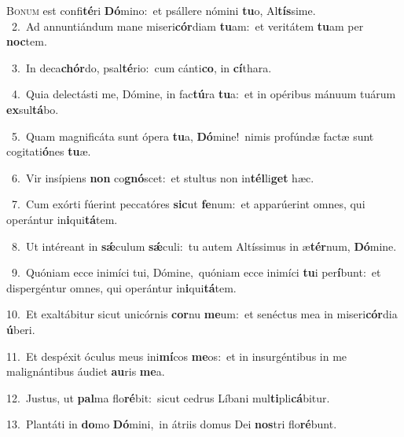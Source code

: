 \lettrine{\initial\textcolor{\initialcolor}{B}}{onum} est confi\-\textbf{té}\-ri \textbf{Dó}\-mino:~\star et psállere nómini \textbf{tu}\-o, Al\-\textbf{tís}\-sime.\\
{\numbfont\textcolor{\numbcolor}{~2.}}~Ad annuntiándum mane miseri\-\textbf{cór}\-diam \textbf{tu}\-am:~\star et veritátem \textbf{tu}\-am per \textbf{noc}\-tem.\par
{\numbfont\textcolor{\numbcolor}{~3.}}~In deca\-\textbf{chór}\-do, psal\-\textbf{té}\-rio:~\star cum cánti\-\textbf{co}\-, in \textbf{cí}\-thara.\par
{\numbfont\textcolor{\numbcolor}{~4.}}~Quia delectásti me, Dómine, in fac\-\textbf{tú}\-ra \textbf{tu}\-a:~\star et in opéribus mánuum tuárum \textbf{ex}\-sul\-\textbf{tá}\-bo.\par
{\numbfont\textcolor{\numbcolor}{~5.}}~Quam magnificáta sunt ópera \textbf{tu}\-a, \textbf{Dó}\-mine!~\star nimis profúndæ factæ sunt cogitati\-\textbf{ó}\-nes \textbf{tu}\-æ.\par
{\numbfont\textcolor{\numbcolor}{~6.}}~Vir insípiens \textbf{non} co\-\textbf{gnó}\-scet:~\star et stultus non in\-\textbf{tél}\-li\textbf{get} hæc.\par
{\numbfont\textcolor{\numbcolor}{~7.}}~Cum exórti fúerint peccatóres \textbf{sic}\-ut \textbf{fe}\-num:~\star et apparúerint omnes, qui operántur in\-\textbf{i}\-qui\-\textbf{tá}\-tem.\par
{\numbfont\textcolor{\numbcolor}{~8.}}~Ut intéreant in \textbf{sǽ}\-culum \textbf{sǽ}\-culi:~\star tu autem Altíssimus in æ\-\textbf{tér}\-num, \textbf{Dó}\-mine.\par
{\numbfont\textcolor{\numbcolor}{~9.}}~Quóniam ecce inimíci tui, Dómine,~\dagger quóniam ecce inimíci \textbf{tu}\-i per\-\textbf{í}\-bunt:~\star et dispergéntur omnes, qui operántur in\-\textbf{i}\-qui\-\textbf{tá}\-tem.\par
{\numbfont\textcolor{\numbcolor}{10.}}~Et exaltábitur sicut unicórnis \textbf{cor}\-nu \textbf{me}\-um:~\star et senéctus mea in miseri\-\textbf{cór}\-dia \textbf{ú}\-beri.\par
{\numbfont\textcolor{\numbcolor}{11.}}~Et despéxit óculus meus ini\-\textbf{mí}\-cos \textbf{me}\-os:~\star et in insurgéntibus in me malignántibus áudiet \textbf{au}\-ris \textbf{me}\-a.\par
{\numbfont\textcolor{\numbcolor}{12.}}~Justus, ut \textbf{pal}\-ma flo\-\textbf{ré}\-bit:~\star sicut cedrus Líbani mul\-\textbf{ti}\-pli\-\textbf{cá}\-bitur.\par
{\numbfont\textcolor{\numbcolor}{13.}}~Plantáti in \textbf{do}\-mo \textbf{Dó}\-mini,~\star in átriis domus Dei \textbf{nos}\-tri flo\-\textbf{ré}\-bunt.\par
